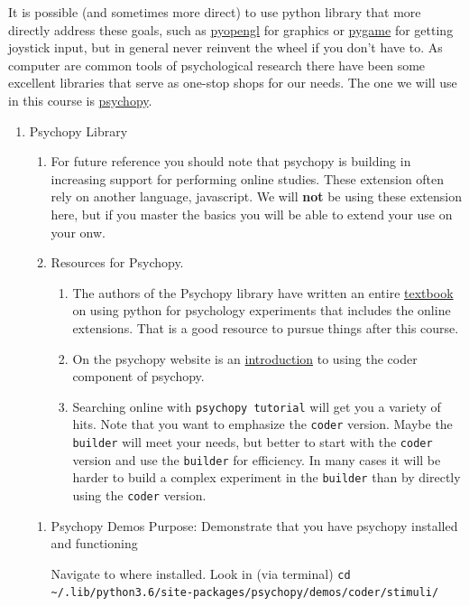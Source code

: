 \documentclass{article}
\begin{document}
It is possible (and sometimes more direct) to use python library that more directly address these goals, such as \href{http://pyopengl.sourceforge.net/}{pyopengl} for graphics or \href{https://www.pygame.org/news}{pygame} for getting joystick input, but in general never reinvent the wheel if you don't have to. As computer are common tools of psychological research there have been some excellent libraries that serve as one-stop shops for our needs. The one we will use in this course is \href{https://www.psychopy.org/}{psychopy}.
\begin{enumerate}
\item Psychopy Library
\label{sec:orga46f5e2}
\begin{enumerate}
\item For future reference you should note that psychopy is building in increasing support for performing online studies. These extension often rely on another language, javascript. We will \textbf{not} be using these extension here, but if you master the basics you will be able to extend your use on your onw.
\item Resources for Psychopy.
\begin{enumerate}
\item The authors of the Psychopy library have written an entire \href{https://us.sagepub.com/en-us/nam/building-experiments-in-psychopy/book253480\#contents}{textbook} on using python for psychology experiments that includes the online extensions. That is a good resource to pursue things after this course.
\item On the psychopy website is an \href{https://www.psychopy.org/coder/coder.html}{introduction} to using the coder component of psychopy.
\item Searching online with \texttt{psychopy tutorial} will get you a variety of hits. Note that you want to emphasize the \texttt{coder} version. Maybe the \texttt{builder} will meet your needs, but better to start with the \texttt{coder} version and use the \texttt{builder} for efficiency. In many cases it will be harder to build a complex experiment in the \texttt{builder} than by directly using the \texttt{coder} version.
\end{enumerate}
\end{enumerate}
\begin{enumerate}
\item Psychopy Demos
\label{sec:org3559cca}
Purpose: Demonstrate that you have psychopy installed and functioning

Navigate to where installed. Look in (via terminal) \texttt{cd \textasciitilde{}/.lib/python3.6/site-packages/psychopy/demos/coder/stimuli/}


\end{enumerate}
\end{enumerate}
\end{document}
